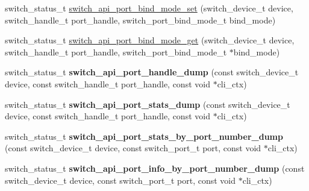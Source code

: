\begin{DoxyCompactItemize}
switch\+\_\+status\+\_\+t \hyperlink{group__Port_ga745fa511d496afbfc4f61debd06739f9}{switch\+\_\+api\+\_\+port\+\_\+bind\+\_\+mode\+\_\+set} (switch\+\_\+device\+\_\+t device, switch\+\_\+handle\+\_\+t port\+\_\+handle, switch\+\_\+port\+\_\+bind\+\_\+mode\+\_\+t bind\+\_\+mode)
\item 
switch\+\_\+status\+\_\+t \hyperlink{group__Port_ga90229db6d4ecab6f911cb13495001a1e}{switch\+\_\+api\+\_\+port\+\_\+bind\+\_\+mode\+\_\+get} (switch\+\_\+device\+\_\+t device, switch\+\_\+handle\+\_\+t port\+\_\+handle, switch\+\_\+port\+\_\+bind\+\_\+mode\+\_\+t $\ast$bind\+\_\+mode)
\item 
\hypertarget{group__Port_gae3980f2bcbbe0394a469f4c5a0099550}{switch\+\_\+status\+\_\+t {\bfseries switch\+\_\+api\+\_\+port\+\_\+handle\+\_\+dump} (const switch\+\_\+device\+\_\+t device, const switch\+\_\+handle\+\_\+t port\+\_\+handle, const void $\ast$cli\+\_\+ctx)}\label{group__Port_gae3980f2bcbbe0394a469f4c5a0099550}

\item 
\hypertarget{group__Port_ga81717a02d795a93080f9cc65733afc83}{switch\+\_\+status\+\_\+t {\bfseries switch\+\_\+api\+\_\+port\+\_\+stats\+\_\+dump} (const switch\+\_\+device\+\_\+t device, const switch\+\_\+handle\+\_\+t port\+\_\+handle, const void $\ast$cli\+\_\+ctx)}\label{group__Port_ga81717a02d795a93080f9cc65733afc83}

\item 
\hypertarget{group__Port_gac36cf8a57441dddae318085b47f542e2}{switch\+\_\+status\+\_\+t {\bfseries switch\+\_\+api\+\_\+port\+\_\+stats\+\_\+by\+\_\+port\+\_\+number\+\_\+dump} (const switch\+\_\+device\+\_\+t device, const switch\+\_\+port\+\_\+t port, const void $\ast$cli\+\_\+ctx)}\label{group__Port_gac36cf8a57441dddae318085b47f542e2}

\item 
\hypertarget{group__Port_gac4c63741a52c14ae8488eb2553e16762}{switch\+\_\+status\+\_\+t {\bfseries switch\+\_\+api\+\_\+port\+\_\+info\+\_\+by\+\_\+port\+\_\+number\+\_\+dump} (const switch\+\_\+device\+\_\+t device, const switch\+\_\+port\+\_\+t port, const void $\ast$cli\+\_\+ctx)}\label{group__Port_gac4c63741a52c14ae8488eb2553e16762}


\end{DoxyCompactItemize}
